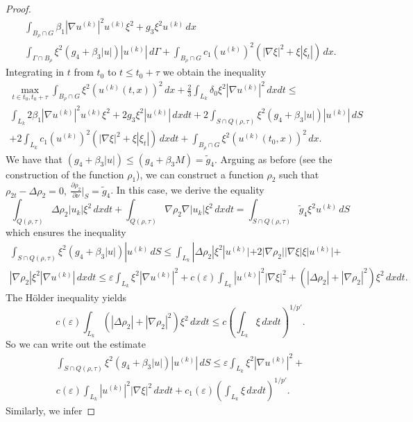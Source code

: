 \documentclass{article}
\theoremstyle{plain}
\begin{document}
\begin{proof}
\begin{multline*}
\int_{B_\rho\cap G} \beta_1|\nabla u^{(k)}|^2 u^{(k)}\xi^2+g_3\xi^2  u^{(k)} \,dx \\
\int_{\Gamma\cap B_\rho}\xi^2 (g_4+\beta_3|u|)|u^{(k)}|\,d\Gamma   
 + \int_{B_\rho\cap G} c_1(u^{(k)})^2(|\nabla \xi|^2+\xi|\xi_t|) \,dx.
\end{multline*}
Integrating in $t$ from $t_0$ to $t\leq t_0+\tau$ we obtain the inequality 
\begin{multline}\label{s1}
\max_{t\in t_0,t_0+\tau} \int_{B_\rho\cap G}\xi^2 (u^{(k)}(t,x))^2\,dx +
\frac{2}{3} \int_{L_k} \delta_0\xi^2 |\nabla u^{(k)}|^2\,dxdt \leq \\
\int_{L_k} 2\beta_1|\nabla u^{(k)}|^2 u^{(k)}\xi^2+2g_3\xi^2  |u^{(k)}| \,dxdt +
2\int_{S\cap Q(\rho,\tau)}\xi^2 (g_4+\beta_3|u|)|u^{(k)}|\,dS \\
 + 2\int_{L_k} c_1(u^{(k)})^2(|\nabla \xi|^2+\xi|\xi_t|) \,dxdt +\int_{B_\rho\cap G}\xi^2 (u^{(k)}(t_0,x))^2\,dx.
\end{multline}
We have that  $(g_4+\beta_3|u|)\leq (g_4+\beta_3M)=\tilde{g}_4$.
Arguing as before (see the construction of the function $\rho_1$), 
we can  construct a function $\rho_2$ such that $\rho_{2t}-\Delta \rho_2=0,\  \frac{\partial \rho_2}{\partial \nu}|_S=\tilde{g}_4 $. In this case, we derive the equality 
$$
\int_{Q(\rho,\tau)} \Delta\rho_2 |u_k|\xi^2\,dxdt+ \int_{Q(\rho,\tau)} \nabla \rho_2\nabla   |u_k|\xi^2\,dxdt=\int_{S\cap Q(\rho,\tau)} \tilde{g}_4\xi^2 u^{(k)}\,dS
$$
which ensures  the inequality 
\begin{multline*}
\int_{S\cap Q(\rho,\tau)}\xi^2 (g_4+\beta_3|u|)|u^{(k)}\,dS\leq \int_{L_k}|\Delta \rho_2|\xi^2 |u^{(k)}|+ 2|\nabla\rho_2||\nabla \xi| \xi |u^{(k)}| +
\\ |\nabla\rho_2|\xi^2 |\nabla u^{(k)}|\, dxdt   \leq  \varepsilon \int_{L_k} \xi^2|\nabla u^{(k)}|^2  + 
c(\varepsilon) \int_{L_k}  |u^{(k)}|^2 |\nabla\xi|^2 + (|\Delta \rho_2|+|\nabla \rho_2|^2)\xi^2\,dxdt. 
\end{multline*}
The H\"{o}lder inequality yields 
$$
c(\varepsilon) \int_{L_k} (|\Delta \rho_2|+|\nabla \rho_2|^2)\xi^2\,dxdt\leq c(\int_{L_k}\xi\,dxdt )^{1/p'}. 
$$
So we can write out the estimate
\begin{multline}\label{s2}
\int_{S\cap Q(\rho,\tau)}\xi^2 (g_4+\beta_3|u|)|u^{(k)}|\,dS\leq  \varepsilon \int_{L_k} \xi^2|\nabla u^{(k)}|^2 + \\
c(\varepsilon) \int_{L_k}  |u^{(k)}|^2 |\nabla\xi|^2\,dxdt + c_1(\varepsilon)(\int_{L_k}\xi\,dxdt )^{1/p'}.
\end{multline}
Similarly, we infer 

\end{proof}
\end{document}
